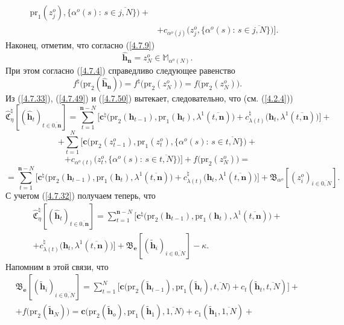 \documentclass[11pt,twoside,openany]{report}
\newcommand{\bfn}{\begin{equation}}
\newcommand{\efn}{\end{equation}}
\newcommand{\ov}{\overline}
\newcommand{\la}{\lambda}
\newcommand{\al}{\alpha}
\newcommand{\zc}{{\mathbf c}}
\newcommand{\nn}{{\mathbf n}}
\begin{document}
{{\begin{eqnarray}
\mathrm{pr}_1(z_j^o),\{\al^o(s):\,s\in \ov{j,N}\}\bigl) +
&\nonumber\\
&+c_{\al^o(j)}\bigl(z_j^o,\{\al^o(s):\,s\in \ov{j,N}\}\bigl)\bigl].
&\label{4.7.49}
\end{eqnarray}
Наконец, отметим, что согласно (\ref{4.7.9})
$$
\hat{\mathbf{h}}_\nn = z_N^o\in \mathbb{M}_{\al^o(N)}.
$$
При этом согласно (\ref{4.7.4}) справедливо следующее равенство
\bfn\label{4.7.50}f^\natural\bigl(\mathrm{pr}_2(\hat{\mathbf{h}}_\nn)\bigl) =
f^\natural\bigl(\mathrm{pr}_2(z_N^o)\bigl) = f\bigl(\mathrm{pr}_2(z_N^o)\bigl).
\efn
Из (\ref{4.7.33}), (\ref{4.7.49}) и (\ref{4.7.50}) вытекает, следовательно, что (см. (\ref{4.2.4}))
$$
\widehat{\mathfrak{C}}_\eta^\natural[(\hat{\mathbf{h}}_t)_{t\in\ov{0,\nn}}] =
\sum\limits_{t=1}^{\nn-N}\bigl[\zc^\natural\bigl(\mathrm{pr}_2(\mathbf{h}_{t-1}),\mathrm{pr}_1
(\mathbf{h}_t),\la^1(\ov{t,\nn})\bigl) + c_{\la(t)}^\natural\bigl(\mathbf{h}_t,
\la^1(\ov{t,\nn})\bigl)\bigl]+
$$
$$+\sum\limits_{t=1}^N \bigl[\zc\bigl(\mathrm{pr}_2(z_{t-1}^o),
\mathrm{pr}_1(z_t^o),\{\al^o(s):\,s\in \ov{t,N}\}\bigl) +
$$
$$
+c_{\al^o(t)}\bigl(z_t^o,\{\al^o(s):\,
s\in \ov{t,N}\}\bigl)\bigl]+ f\bigl(\mathrm{pr}_2(z_N^o)\bigl) =
$$
$$=\sum\limits_{t=1}^{\nn-N}
\bigl[\zc^\natural\bigl(\mathrm{pr}_2(\mathbf{h}_{t-1}),\mathrm{pr}_1
(\mathbf{h}_t),\la^1(\ov{t,\nn})\bigl)+ c_{\la(t)}^\natural\bigl(\mathbf{h}_t,\la^1(\ov{t,\nn})
\bigl)\bigl] + \mathfrak{B}_{\al^o}[(z_i^o)_{i\in\ov{0,N}}].
$$
С учетом (\ref{4.7.32}) получаем теперь, что
\begin{eqnarray}
&\widehat{\mathfrak{C}}_\eta^\natural[(\hat{\mathbf{h}}_t)_{t\in\ov{0,\nn}}] =
\sum\limits_{t=1}^{\nn-N}\bigl[\zc^\natural\bigl(\mathrm{pr}_2(\mathbf{h}_{t-1}),\mathrm{pr}_1
(\mathbf{h}_t),\la^1(\ov{t,\nn})\bigl) +
&\nonumber\\
&+ c_{\la(t)}^\natural\bigl(\mathbf{h}_t,\la^1(\ov{t,\nn})\bigl)\bigl]+
\mathfrak{B}_\mathbf{e}[(\tilde{\mathbf{h}}_i)_{i\in\ov{0,N}}]-\kappa.
&\label{4.7.51}
\end{eqnarray}
 Напомним в этой связи, что
\begin{eqnarray}
&\mathfrak{B}_\mathbf{e}[(\tilde{\mathbf{h}}_i)_{i\in\ov{0,N}}] =
\sum\limits_{t=1}^N\bigl[\zc\bigl(\mathrm{pr}_2(\tilde{\mathbf{h}}_{t-1}),\mathrm{pr}_1
(\tilde{\mathbf{h}}_t),\ov{t,N}) + c_t(\tilde{\mathbf{h}}_t,\ov{t,N})\bigl]+
&\nonumber\\
&+f\bigl(\mathrm{pr}_2(\tilde{\mathbf{h}}_N)\bigl) =
\zc\bigl(\mathrm{pr}_2(\tilde{\mathbf{h}}_o),\mathrm{pr}_1
(\tilde{\mathbf{h}}_1),\ov{1,N}) +c_1(\tilde{\mathbf{h}}_1,\ov{1,N}) +

\end{eqnarray}}}
\end{document}
